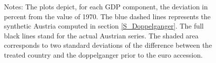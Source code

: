 \documentclass[12pt]{article}
\newcommand{\annote}[1]{\parbox{\textwidth}{\renewcommand{\baselinestretch}{1.0}\vspace{12pt} \small Notes: #1}}
\begin{document}
\begin{appendices}
\begin{figure}[h!]
    \annote{The plots depict, for each GDP component, the deviation in percent from the value of 1970. The blue dashed lines represents the synthetic Austria computed in section \ref{S_Doppelganger}. The full black lines stand for the actual Austrian series. The shaded area corresponds to two standard deviations of the difference between the treated country and the doppelganger prior to the euro accession.}
\end{figure}


\end{appendices}
\end{document}

